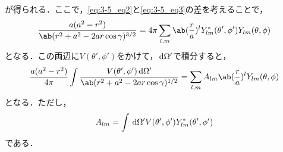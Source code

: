   が得られる．ここで，\eqref{eq:3-5_eq2}と\eqref{eq:3-5_eq3}の差を考えることで，
  \begin{gather}%
    \frac{a(a^2 - r^2)}{\ab(r^2 + a^2 - 2ar\cos\gamma)^{3/2}}
    = 4\pi \sum_{l,m} \ab(\frac r a)^l Y^*_{lm}(\theta',\phi') Y_{lm}(\theta,\phi)
  \end{gather}%
  となる．この両辺に$V(\theta',\phi')$をかけて，$\dl{\Omega'}$で積分すると，
  \begin{gather}%
    \frac{a(a^2 - r^2)}{4\pi} \int  
    \frac{V(\theta',\phi')\dl{\Omega'}}{\ab(r^2 + a^2 - 2ar\cos\gamma)^{1/2}} = 
    \sum_{l,m} A_{lm} \ab(\frac ra)^l Y_{lm}(\theta,\phi)
  \end{gather}%
  となる．ただし，
  \begin{gather}%
    A_{lm} = \int \dl{\Omega'} V(\theta',\phi') Y^*_{lm}(\theta',\phi')
  \end{gather}%
  である．

\clearpage
